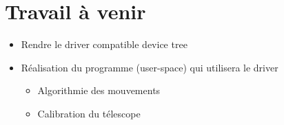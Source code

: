 \chapter{Travail à venir}

\begin{itemize}[label=$\bullet$]
	\item Rendre le driver compatible device tree
	\item Réalisation du programme (user-space) qui utilisera le driver
	\begin{itemize}
		\item Algorithmie des mouvements
		\item Calibration du télescope
		\end{itemize}
	\end{itemize}
